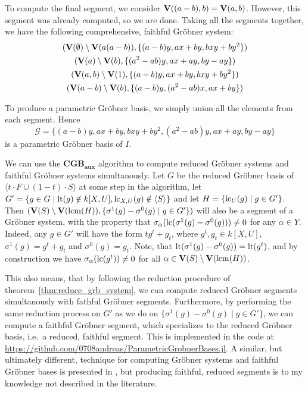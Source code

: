\begin{example}
  To compute the final segment, we consider $\operatorname{\mathbf V}((a - b), b) = \operatorname{\mathbf V}(a, b)$. However, this segment was already computed, so we are done. Taking all the segments together, we have the following comprehensive, faithful Gröbner system:
  \begin{gather*}
    (\operatorname{\mathbf V}(\emptyset) \setminus \operatorname{\mathbf V}(a(a - b)), \{(a - b)y, ax + by, bxy + by^{2}\}) \\
    (\operatorname{\mathbf V}(a) \setminus \operatorname{\mathbf V}(b),\{(a^2 - ab)y, ax + ay, by - ay\} )  \\
    (\operatorname{\mathbf V}(a, b) \setminus \operatorname{\mathbf V}(1), \{(a - b)y, ax + by, bxy + by^2\}) \\
    (\operatorname{\mathbf V}(a - b) \setminus \operatorname{\mathbf V}(b), \{(a - b)y, (a^2 - ab)x, ax + by \})
  \end{gather*}

  To produce a parametric Gröbner basis, we simply union all the elements from each segment. Hence
  \[\mathcal G = \{(a - b)y, ax + by, bxy + by^{2}, (a^{2} - ab)y, ax + ay, by - ay\}\]
  is a parametric Gröbner basis of $I$.

\end{example}

\begin{remark}\label{rem:CGS_CGB_together}\upshape
  We can use the $\mathbf{CGB_{aux}}$ algorithm to compute reduced Gröbner systems and faithful Gröbner systems simultanously. Let $G$ be the reduced Gröbner basis of $\langle t \cdot F \cup (1 - t) \cdot S \rangle$ at some step in the algorithm, let $G' = \{g \in G \mid \operatorname{lt}(g) \notin k[X, U], \operatorname{lc}_{X, U}(g) \notin \langle S \rangle\}$ and let $H = \{\operatorname{lc}_{U}(g) \mid g \in G'\}$. Then $(\operatorname{\mathbf V}(S) \setminus \operatorname{\mathbf V}(\operatorname{lcm}(H)), \{\sigma^{1}(g) - \sigma^{0}(g) \mid g \in G'\})$ will also be a segment of a Gröbner system, with the property that $\sigma_{\alpha}(\operatorname{lc}(\sigma^{1}(g) - \sigma^{0}(g))) \neq 0$ for any $\alpha \in Y$. Indeed, any $g \in G'$ will have the form $t g^{t} + g_{t}$, where $g^{t}, g_{t} \in k[X, U]$, $\sigma^{1}(g) = g^{t} + g_{t}$ and $\sigma^{0}(g) = g_{t}$. Note, that $\operatorname{lt}(\sigma^{1}(g) - \sigma^{0}(g)) = \operatorname{lt}(g^{t})$, and by construction we have $\sigma_{\alpha}(\operatorname{lc}(g^{t})) \neq 0$ for all $\alpha \in \operatorname{\mathbf V}(S) \setminus \operatorname{\mathbf V}(\operatorname{lcm}(H))$.

  This also means, that by following the reduction procedure of theorem~\ref{thm:reduce_grb_system}, we can compute reduced Gröbner segments simultanously with fathful Gröbner segments. Furthermore, by performing the same reduction process on $G'$ as we do on $\{\sigma^{1}(g) - \sigma^{0}(g) \mid g \in G'\}$, we can compute a faithful Gröbner segment, which specializes to the reduced Gröbner basis, i.e.\ a reduced, faithful segment. This is implemented in the code at \url{https://github.com/0708andreas/ParametricGrobnerBases.jl}. A similar, but ultimately different, technique for computing Gröbner systems and faithful Gröbner bases is presented in \cite{10.1145/1993886.1993918}, but producing faithful, reduced segments is to my knowledge not described in the literature.
\end{remark}
